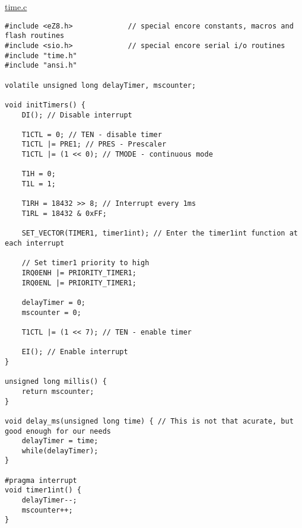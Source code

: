 \underline{time.c}
\begin{lstlisting}
#include <eZ8.h>             // special encore constants, macros and flash routines
#include <sio.h>             // special encore serial i/o routines
#include "time.h"
#include "ansi.h"

volatile unsigned long delayTimer, mscounter;

void initTimers() {
	DI(); // Disable interrupt

	T1CTL = 0; // TEN - disable timer
	T1CTL |= PRE1; // PRES - Prescaler
	T1CTL |= (1 << 0); // TMODE - continuous mode

	T1H = 0;
	T1L = 1;
	
	T1RH = 18432 >> 8; // Interrupt every 1ms
	T1RL = 18432 & 0xFF;

	SET_VECTOR(TIMER1, timer1int); // Enter the timer1int function at each interrupt
	
	// Set timer1 priority to high
	IRQ0ENH |= PRIORITY_TIMER1;
	IRQ0ENL |= PRIORITY_TIMER1;
	
	delayTimer = 0;
	mscounter = 0;

	T1CTL |= (1 << 7); // TEN - enable timer

	EI(); // Enable interrupt
}

unsigned long millis() {
	return mscounter;
}

void delay_ms(unsigned long time) { // This is not that acurate, but good enough for our needs
	delayTimer = time;
	while(delayTimer);
}

#pragma interrupt
void timer1int() {
	delayTimer--;
	mscounter++;
}
\end{lstlisting}
